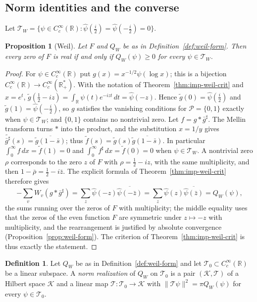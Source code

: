 \documentclass[11pt]{amsart}
\theoremstyle{plain}
\newtheorem{proposition}[theorem]{Proposition}
\theoremstyle{definition}
\newtheorem{definition}[theorem]{Definition}
\theoremstyle{remark}
\numberwithin{equation}{section}
\newcommand{\R}{\mathbb{R}}
\begin{document}
\subsection{Norm identities and the converse}\label{subsec:norm}

Let $\mathcal T_W=\{\psi\in C_c^\infty(\R):\widehat\psi(\tfrac i2)
=\widehat\psi(-\tfrac i2)=0\}$.

\begin{proposition}[Weil]\label{prop:weil-crit-notes}
Let $F$ and $Q_W$ be as in Definition~\ref{def:weil-form}. Then every
zero of $F$ is real if and only if $Q_W(\psi)\ge0$ for every
$\psi\in\mathcal T_W$.
\end{proposition}

\begin{proof}
For $\psi\in C_c^\infty(\R)$ put $g(x)=x^{-1/2}\psi(\log x)$; this is a
bijection $C_c^\infty(\R)\to C_c^\infty(\R_+^*)$. With the notation of
Theorem~\ref{thm:imp-weil-crit} and $x=e^t$,
$\widetilde g(\tfrac12-iz)=\int_\R\psi(t)e^{-izt}\,dt=\widehat\psi(-z)$.
Hence $\widetilde g(0)=\widehat\psi(\tfrac i2)$ and
$\widetilde g(1)=\widehat\psi(-\tfrac i2)$, so $g$ satisfies the
vanishing conditions for $\mathcal P=\{0,1\}$ exactly when
$\psi\in\mathcal T_W$; and $\{0,1\}$ contains no nontrivial zero. Let
$f=g*\bar g^\sharp$. The Mellin transform turns $*$ into the product,
and the substitution $x=1/y$ gives $\widetilde{\bar g^\sharp}(s)=
\overline{\widetilde g(1-\bar s)}$; thus $\widetilde f(s)=\widetilde
g(s)\overline{\widetilde g(1-\bar s)}$. In particular
$\int_0^\infty f\,dx=\widetilde f(1)=0$ and
$\int_0^\infty f^\sharp\,dx=\widetilde f(0)=0$ when
$\psi\in\mathcal T_W$. A nontrivial zero $\rho$ corresponds to the zero
$z$ of $F$ with $\rho=\tfrac12-iz$, with the same multiplicity, and then
$1-\bar\rho=\tfrac12-i\bar z$. The explicit formula of
Theorem~\ref{thm:imp-weil-crit} therefore gives
\[
-\sum_vW_v(g*\bar g^\sharp)=\sum_{z}\widehat\psi(-z)
\overline{\widehat\psi(-\bar z)}=\sum_z\widehat\psi(z)
\overline{\widehat\psi(\bar z)}=Q_W(\psi),
\]
the sums running over the zeros of $F$ with multiplicity; the middle
equality uses that the zeros of the even function $F$ are symmetric
under $z\mapsto-z$ with multiplicity, and the rearrangement is justified
by absolute convergence (Proposition~\ref{prop:weil-form}). The
criterion of Theorem~\ref{thm:imp-weil-crit} is thus exactly the
statement.
\end{proof}

\begin{definition}\label{def:norm-realization}
Let $Q_W$ be as in Definition~\ref{def:weil-form} and let
$\mathcal T_0\subset C_c^\infty(\R)$ be a linear subspace. A
\emph{norm realization} of $Q_W$ on $\mathcal T_0$ is a pair
$(\mathcal K,\mathcal T)$ of a Hilbert space $\mathcal K$ and a linear
map $\mathcal T:\mathcal T_0\to\mathcal K$ with
$\|\mathcal T\psi\|^2=\pi Q_W(\psi)$ for every $\psi\in\mathcal T_0$.
\end{definition}
\end{document}
